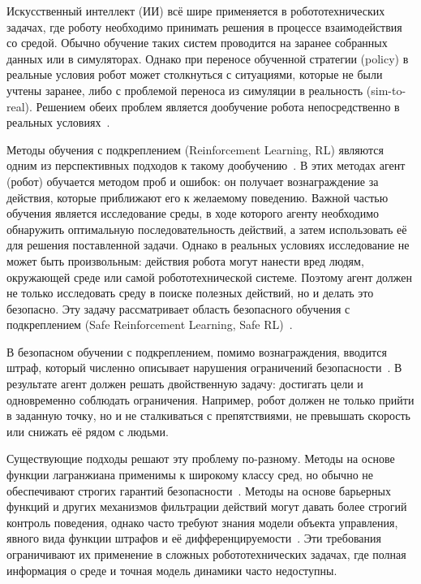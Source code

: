 
{\actuality}
Искусственный интеллект (ИИ) всё шире применяется в робототехнических задачах, где роботу необходимо принимать решения в процессе взаимодействия со средой. Обычно обучение таких систем проводится на заранее собранных данных или в симуляторах. Однако при переносе обученной стратегии (policy) в реальные условия робот может столкнуться с ситуациями, которые не были учтены заранее, либо с проблемой переноса из симуляции в реальность (sim-to-real). Решением обеих проблем является дообучение робота непосредственно в реальных условиях~.

Методы обучения с подкреплением (Reinforcement Learning, RL) являются одним из перспективных подходов к такому дообучению~. В этих методах агент (робот) обучается методом проб и ошибок: он получает вознаграждение за действия, которые приближают его к желаемому поведению. Важной частью обучения является исследование среды, в ходе которого агенту необходимо обнаружить оптимальную последовательность действий, а затем использовать её для решения поставленной задачи. Однако в реальных условиях исследование не может быть произвольным: действия робота могут нанести вред людям, окружающей среде или самой робототехнической системе. Поэтому агент должен не только исследовать среду в поиске полезных действий, но и делать это безопасно. Эту задачу рассматривает область безопасного обучения с подкреплением (Safe Reinforcement Learning, Safe RL)~.

В безопасном обучении с подкреплением, помимо вознаграждения, вводится штраф, который численно описывает нарушения ограничений безопасности~. В результате агент должен решать двойственную задачу: достигать цели и одновременно соблюдать ограничения. Например, робот должен не только прийти в заданную точку, но и не сталкиваться с препятствиями, не превышать скорость или снижать её рядом с людьми.

Существующие подходы решают эту проблему по-разному. Методы на основе функции лагранжиана применимы к широкому классу сред, но обычно не обеспечивают строгих гарантий безопасности~. Методы на основе барьерных функций и других механизмов фильтрации действий могут давать более строгий контроль поведения, однако часто требуют знания модели объекта управления, явного вида функции штрафов и её дифференцируемости~. Эти требования ограничивают их применение в сложных робототехнических задачах, где полная информация о среде и точная модель динамики часто недоступны.

